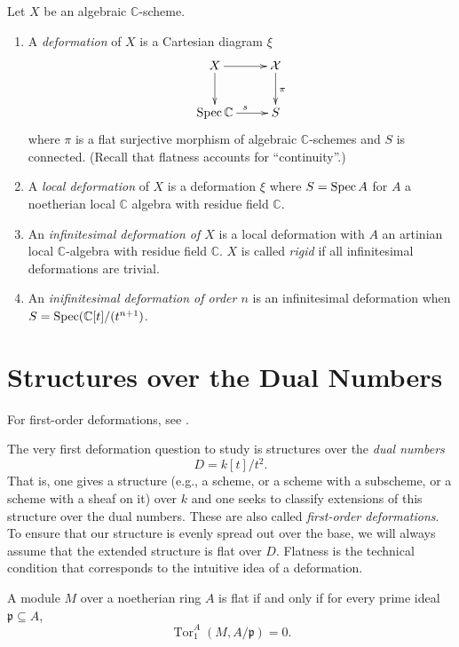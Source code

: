 \begin{definition}
\label{definition-deformation}
Let $X$ be an algebraic $\mathbb{C}$-scheme.
\begin{enumerate}
\item A {\it deformation} of $X$ is a
Cartesian diagram $\xi$
$$
\xymatrix{
X\ar[r]\ar[d]&\mathcal{X}\ar[d]^{\pi}\\
\Spec \mathbb{C}\ar[r]^s&S
}
$$
where $\pi$ is a flat surjective morphism of
algebraic $\mathbb{C}$-schemes and
$S$ is connected. (Recall that flatness
accounts for ``continuity''.)
\item A {\it local deformation} of $X$ is a
deformation $\xi$ where
$S=\mathop{\mathrm{Spec}} A$ for $A$ a noetherian local
$\mathbb{C}$ algebra with residue
field $\mathbb{C}$.
\item An {\it infinitesimal deformation of
$X$} is a local deformation with $A$
an artinian local $\mathbb{C}$-algebra with
residue field $\mathbb{C}$. $X$ is
called {\it rigid} if all infinitesimal
deformations are trivial.
\item An {\it inifinitesimal deformation of
order $n$} is an infinitesimal
deformation when $S=\mathop{\mathrm{Spec}}
(\mathbb{C}[t]/(t^{n+1})$.
\end{enumerate}
\end{definition}


\section{Structures over the Dual Numbers}
\label{section-structures-dual-numbers}

\noindent
For first-order deformations, see
\cite[Chapter 1, Section 2]
{Hartshorne-deformation}.

\begin{definition}
\label{definition-dual-numbers-first-order}
The very first deformation question to study
is structures over the \emph{dual numbers}
$$
D=k[t]/t^2.
$$
That is, one gives a structure (e.g., a
scheme, or a scheme with a subscheme, or a
scheme with a sheaf on it) over $k$ and one
seeks to classify extensions of this
structure over the dual numbers. These are
also called \emph{first-order deformations}.
To ensure that our structure is evenly
spread out over the base, we will always
assume that the extended structure is flat
over $D$. Flatness is the technical condition
that corresponds to the intuitive idea of a
deformation.
\end{definition}

\begin{lemma}
\label{lemma-flatness-tor}
A module $M$ over a noetherian ring $A$ is
flat if and only if for every prime ideal
$\mathfrak{p}\subseteq A$,
$$
\operatorname{Tor}^A_1
(M,A/\mathfrak{p})=0.
$$
\end{lemma}


